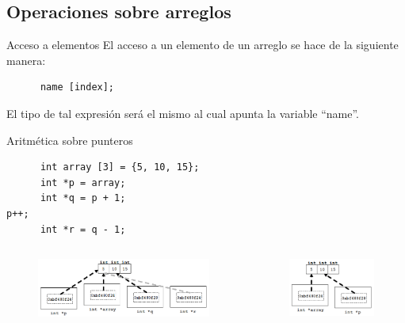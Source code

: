 \documentclass[xcolor=table,spanish,9pt]{beamer}
\begin{document}
\subsection{Operaciones sobre arreglos}

\begin{frame}[fragile]
  \begin{block}{Acceso a elementos}
    El acceso a un elemento de un arreglo se hace de la siguiente manera:
    \begin{lstlisting}
      name [index];
    \end{lstlisting}
    El tipo de tal expresión será el mismo al cual apunta la variable ``name''.
  \end{block}
  \begin{block}{Aritmética sobre punteros}
    \begin{lstlisting}
      int array [3] = {5, 10, 15};
      int *p = array;
      int *q = p + 1;                                                             p++;
      int *r = q - 1;
    \end{lstlisting}
    \begin{columns}
      \begin{column}{.65\linewidth}
	\begin{figure}
	  \includegraphics[width=6cm,keepaspectratio=true,clip=true]
	  {./figures/pointers_arithmetics.png}\\
	\end{figure}
      \end{column}
      \begin{column}{.35\linewidth}
	\begin{figure}
	  \includegraphics[width=3cm,keepaspectratio=true,clip=true]
	  {./figures/pointers_increase.png}\\
	\end{figure}
      \end{column}
    \end{columns}
  \end{block}
\end{frame}
\end{document}
